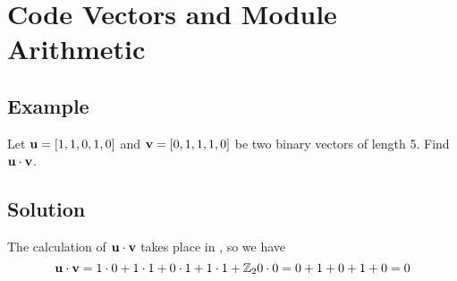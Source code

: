 \section{Code Vectors and Module Arithmetic}

\subsection*{Example}
Let $\mathbf{u} = [1,1,0,1,0]$ and $\mathbf{v} = [0,1,1,1,0]$ be two binary vectors of
length 5. Find $\mathbf{u\cdot v}$.

\subsection*{Solution}
The calculation of $\mathbf{u\cdot v}$ takes place in , so we have
$$\mathbf{u\cdot v}=1\cdot0+1\cdot1+0\cdot1+1\cdot1+\mathbb{Z}_2 0\cdot0=0+1+0+1+0=0$$
